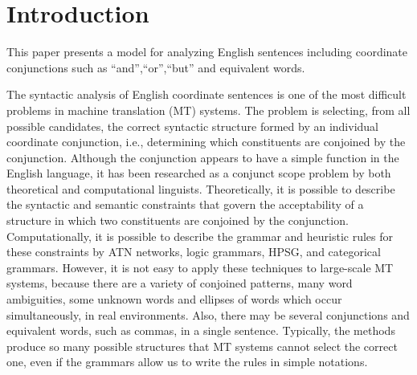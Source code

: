 \maketitle
\thispagestyle{headings}



\section{Introduction}

This paper presents a model for analyzing English sentences including
coordinate conjunctions such as ``and'',``or'',``but'' and 
equivalent words.

The syntactic analysis of English coordinate sentences is one of the most
difficult problems in machine translation (MT) systems.  The problem
is selecting, from all possible candidates, the correct syntactic
structure formed by an individual coordinate conjunction, i.e.,
determining which constituents are conjoined by the conjunction.
Although the conjunction appears to have a simple function in the
English language, it has been researched as a conjunct scope problem
by both theoretical and computational
linguists.
Theoretically, it is possible to describe the syntactic and semantic
constraints that govern the acceptability of a structure in which two
constituents are conjoined by the
conjunction\cite{Lesmo85,Gazdar81,Schachter77}.
Computationally, it is possible to describe the grammar and heuristic
rules for these constraints by ATN networks, logic grammars, HPSG, and
categorical
grammars\cite{Kosy86,Fong85,Huang84,Boguraev83,Blackwell81,Niimi86}.
However, it is not easy to apply these techniques to
large-scale MT systems, because there are a variety of conjoined
patterns, many word ambiguities, some unknown words and ellipses of
words which occur simultaneously, in real environments.
Also, there may be several conjunctions and equivalent
words, such as commas, in a single sentence.  Typically, the
methods produce so many possible structures that MT systems cannot
select the correct one, even if the grammars allow us to write the rules
in simple notations.

